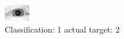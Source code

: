 \begin{figure}[h!]
\begin{center}
\includegraphics[width=0.60\columnwidth]{figures/ID3085_class_1_target_2.png}
\end{center}
\caption{ Classification: 1 actual target: 2}
\label{fig:ID3085_class_1_target_2}
\end{figure}
